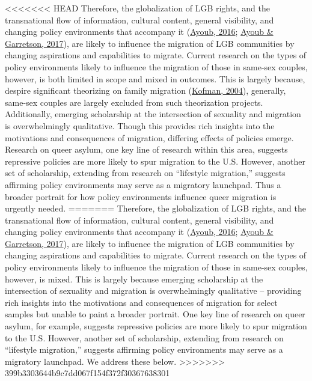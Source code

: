 \documentclass[
  11pt,
]{article}
\begin{document}
\textless\textless\textless\textless\textless\textless\textless{} HEAD
Therefore, the globalization of LGB rights, and the transnational flow of information, cultural content, general visibility, and changing policy environments that accompany it (\protect\hyperlink{ref-ayoub_2016}{Ayoub, 2016}; \protect\hyperlink{ref-ayoub_2017}{Ayoub \& Garretson, 2017}), are likely to influence the migration of LGB communities by changing aspirations and capabilities to migrate. Current research on the types of policy environments likely to influence the migration of those in same-sex couples, however, is both limited in scope and mixed in outcomes. This is largely because, despire significant theorizing on family migration (\protect\hyperlink{ref-kofman_2004_family}{Kofman, 2004}), generally, same-sex couples are largely excluded from such theorization projects. Additionally, emerging scholarship at the intersection of sexuality and migration is overwhelmingly qualitative. Though this provides rich insights into the motivations and consequences of migration, differing effects of policies emerge. Research on queer asylum, one key line of research within this area, suggests repressive policies are more likely to spur migration to the U.S. However, another set of scholarship, extending from research on ``lifestyle migration,'' suggests affirming policy environments may serve as a migratory launchpad. Thus a broader portrait for how policy environments influence queer migration is urgently needed.
=======
Therefore, the globalization of LGB rights, and the transnational flow of information, cultural content, general visibility, and changing policy environments that accompany it (\protect\hyperlink{ref-ayoub_2016}{Ayoub, 2016}; \protect\hyperlink{ref-ayoub_2017}{Ayoub \& Garretson, 2017}), are likely to influence the migration of LGB communities by changing aspirations and capabilities to migrate. Current research on the types of policy environments likely to influence the migration of those in same-sex couples, however, is mixed. This is largely because emerging scholarship at the intersection of sexuality and migration is overwhelmingly qualitative -- providing rich insights into the motivations and consequences of migration for select samples but unable to paint a broader portrait. One key line of research on queer asylum, for example, suggests repressive policies are more likely to spur migration to the U.S. However, another set of scholarship, extending from research on ``lifestyle migration,'' suggests affirming policy environments may serve as a migratory launchpad. We address these below.
\textgreater\textgreater\textgreater\textgreater\textgreater\textgreater\textgreater{} 399b3303644b9c7dd067f154f372f30367638301
\end{document}
